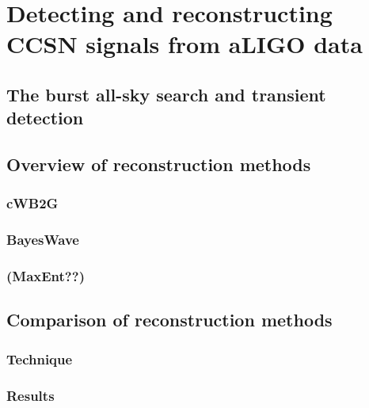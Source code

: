 \chapter{Detecting and reconstructing CCSN signals from aLIGO data }

\section{The burst all-sky search and transient detection} 
\section{Overview of reconstruction methods} 
\subsection{cWB2G} 
\subsection{BayesWave}
\subsection{(MaxEnt??)} 

%
\section{Comparison of reconstruction methods}
\subsection{Technique }
\subsection{Results }

